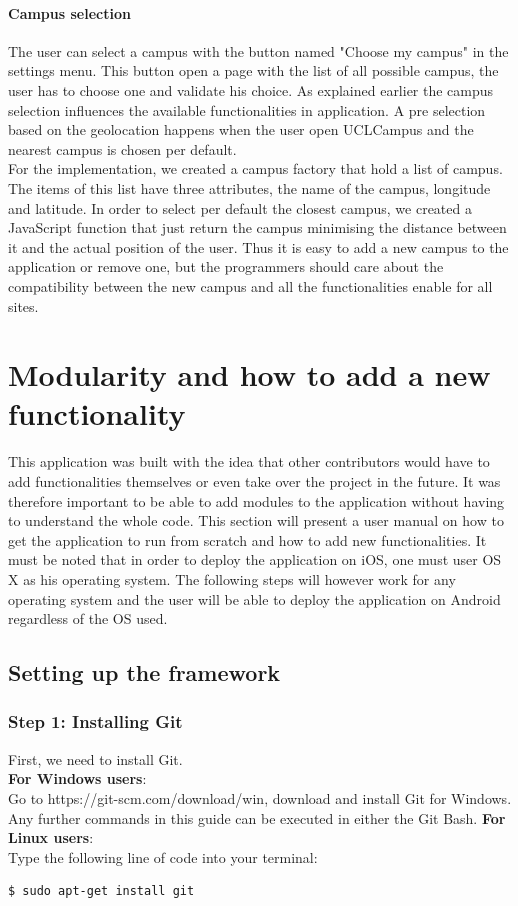 \documentclass{eplmastersthesis}
\begin{document}
\paragraph{Campus selection} The user can select a campus with the button named "Choose my campus" in the settings menu. This button open a page with the list of all possible campus, the user has to choose one and validate his choice. As explained earlier the campus selection influences the available functionalities in application. A pre selection based on the geolocation happens when the user open UCLCampus and the nearest campus is chosen per default.\\
For the implementation, we created a campus factory that hold a list of campus. The items of this list have three attributes, the name of the campus, longitude and latitude. In order to select per default the closest campus, we created a JavaScript function that just return the campus minimising the distance between it and the actual position of the user. Thus it is easy to add a new campus to the application or remove one, but the programmers should care about the compatibility between the new campus and all the functionalities enable for all sites. 
\section{Modularity and how to add a new functionality}
This application was built with the idea that other contributors would have to add functionalities themselves or even take over the project in the future. It was therefore important to be able to add modules to the application without having to understand the whole code. 
This section will present a user manual on how to get the application to run from scratch and how to add new functionalities.  It must be noted that in order to deploy the application on iOS, one must user OS X as his operating system.  The following steps will however work for any operating system and the user will be able to deploy the application on Android regardless of the OS used.
\subsection{Setting up the framework}
\subsubsection{Step 1: Installing Git}
First,  we need to install Git.\\
\textbf{For Windows users}: \\
Go to https://git-scm.com/download/win, download and install Git for Windows. Any further commands in this guide can be executed in either the Git Bash. 
\textbf{For Linux users}: \\
Type the following line of code into your terminal:
\begin{lstlisting}[language=bash]
  $ sudo apt-get install git
\end{lstlisting}
\end{document}
